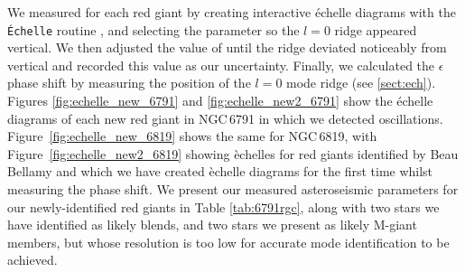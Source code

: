 
We measured \dnu{} for each red giant by creating interactive \'echelle diagrams with the \texttt{\'Echelle} routine \citep{daniel_hey_echelle_2020}, and selecting the \dnu{} parameter so the $l = 0$ ridge appeared vertical. We then adjusted the value of \dnu{} until the ridge deviated noticeably from vertical and recorded this value as our uncertainty. Finally, we calculated the $\epsilon$ phase shift by measuring the position of the $l = 0$ mode ridge (see \cref{sect:ech}). Figures \ref{fig:echelle_new_6791} and \ref{fig:echelle_new2_6791} show the \'echelle diagrams of each new red giant in NGC\,6791 in which we detected oscillations. Figure~\ref{fig:echelle_new_6819} shows the same for NGC\,6819, with Figure~\ref{fig:echelle_new2_6819} showing \`echelles for red giants identified by Beau Bellamy and which we have created \`echelle diagrams for the first time whilst measuring the phase shift. We present our measured asteroseismic parameters for our newly-identified red giants in Table \ref{tab:6791rgc}, along with two stars we have identified as likely blends, and two stars we present as likely M-giant members, but whose resolution is too low for accurate mode identification to be achieved.



